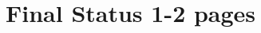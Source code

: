 \documentclass[11pt]{article}
\begin{document}
\section{Final Status 1-2 pages}



%


 
\newpage




\end{document}
